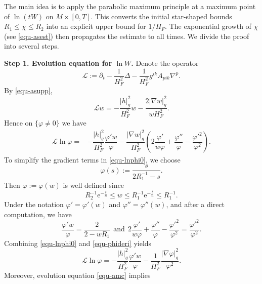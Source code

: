\documentclass[11pt,reqno]{amsart}
\theoremstyle{definition}
\theoremstyle{remark}
\numberwithin{equation}{section}
\begin{document}
		The main idea is to apply the parabolic maximum principle at a maximum point of $\ln(tW)$ on $M\times[0,T]$. This converts the initial star-shaped bounds $R_1 \leq \chi \leq R_2$ into an explicit upper bound for $1/H_F$. The exponential growth of $\chi$ (see \eqref{equ-asest}) then propagates the estimate to all times. We divide the proof into several steps.
		
		\textbf{Step 1. Evolution equation for $\ln W$.} Denote the operator
		\begin{equation*}
			\mathscr{L}:=\partial_t  - \dfrac{1}{H_F^2}\Delta- \dfrac{1}{H_F^2}g^{ik}A_{pik}\nabla^p.
		\end{equation*}
		By \eqref{equ-asupp},
		\begin{equation*}
			\mathscr{L} w = - \dfrac{|h|_{g}^2}{H_F^2}w - \dfrac{2|\nabla w|_{g}^2}{w H_F^2}.
		\end{equation*}
		Hence on $\{\varphi\neq 0\}$ we have
		\begin{align}
			\mathscr{L} \ln\varphi =& -\dfrac{|h|_{g}^2}{H_F^2}\dfrac{\varphi' w}{\varphi} - \dfrac{|\nabla w|_{g}^2}{H_F^2}\left( 2\dfrac{\varphi'}{w\varphi} + \dfrac{\varphi''}{\varphi} - \dfrac{\varphi'^2}{\varphi^2} \right). \label{equ-lnphi0}
		\end{align}
		To simplify the gradient terms in \eqref{equ-lnphi0}, we choose
		\begin{equation*}
			\varphi(s):= \dfrac{s}{2R_1^{-1}-s}.
		\end{equation*}
		Then $\varphi:=\varphi(w)$ is well defined since
		\begin{equation}
			R_2^{-1}\mathrm{e}^{-\frac{t}{n}} \leq w \leq R_1^{-1}\mathrm{e}^{-\frac{t}{n}} \leq R_1^{-1}.
			\label{equ-west}
		\end{equation}
		Under the notation $\varphi'=\varphi'(w)$ and $\varphi''=\varphi''(w)$, and after a direct computation, we have
		\begin{equation}
			\dfrac{\varphi' w}{\varphi} = \dfrac{2}{2-w R_1}\ \ \text{and}\ \ 2\dfrac{\varphi'}{w\varphi} + \dfrac{\varphi''}{\varphi} - \dfrac{\varphi'^2}{\varphi^2} = \dfrac{\varphi'^2}{\varphi^2}.
			\label{equ-phideri}
		\end{equation}
		Combining \eqref{equ-lnphi0} and \eqref{equ-phideri} yields
		\begin{equation}
			\mathscr{L}\ln\varphi = -\dfrac{|h|_{g}^2}{H_F^2}\dfrac{\varphi' w}{\varphi} -\dfrac{1}{H_F^2}\dfrac{|\nabla\varphi|^2_{g}}{\varphi^2}. \label{equ-lnphi}
		\end{equation}
		Moreover, evolution equation \eqref{equ-amc} implies
\end{document}
